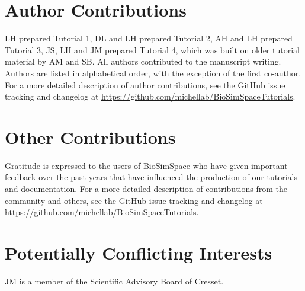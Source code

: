 \documentclass[9pt,tutorial]{livecoms}
\newcommand{\githubrepository}{\url{https://github.com/michellab/BioSimSpaceTutorials}}  %
\begin{document}
\section{Author Contributions}
%
LH prepared Tutorial 1, DL and LH prepared Tutorial 2, AH and LH prepared Tutorial 3, JS, LH and JM prepared Tutorial 4, which was built on older tutorial material by AM and SB.
All authors contributed to the manuscript writing. Authors are listed in alphabetical order, with the exception of the first co-author.
For a more detailed description of author contributions,
see the GitHub issue tracking and changelog at \githubrepository.

\section{Other Contributions}
%
Gratitude is expressed to the users of BioSimSpace who have given important feedback over the past years that have influenced the production of our tutorials and documentation. 
For a more detailed description of contributions from the community and others, see the GitHub issue tracking and changelog at \githubrepository.

\section{Potentially Conflicting Interests}
JM is a member of the Scientific Advisory Board of Cresset. 
\end{document}
